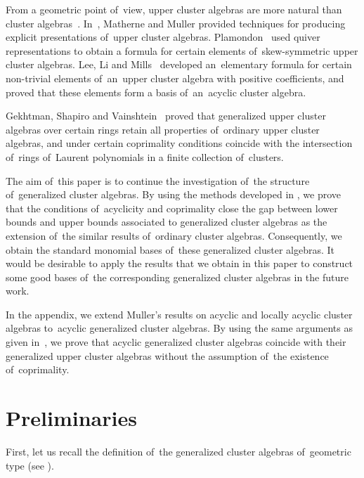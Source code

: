 \documentclass[10pt,a4paper]{amsart}
\numberwithin{equation}{section}
\begin{document}
From a geometric point of~view, upper cluster algebras are more natural than cluster algebras~\cite{BMRS, GHK1}. In~\cite{MM15}, Matherne and Muller provided techniques for producing explicit presentations of~upper cluster algebras. Plamondon~\cite{P} used quiver representations to obtain a formula for certain elements of~skew-symmetric upper cluster algebras. Lee, Li and Mills~\cite{LLM} developed an~elementary formula for certain non-trivial elements of~an~upper cluster algebra with positive coefficients, and proved that these elements form a basis of~an~acyclic cluster algebra.

Gekhtman, Shapiro and Vainshtein~\cite{gsv18} proved that generalized upper cluster algebras over certain rings retain all properties of~ordinary upper cluster algebras, and under certain copri\-mality conditions coincide with the intersection of~rings of~Laurent polynomials in a finite collection of~clusters.

The aim of~this paper is to continue the investigation of~the structure of~generalized cluster algebras. By using the methods developed in \cite{bfz}, we prove that the conditions of~acyclicity and coprimality close the gap between lower bounds and upper bounds associated to generalized cluster algebras as the extension of~the similar results of~ordinary cluster algebras. Consequently, we obtain the standard monomial bases of~these generalized cluster algebras. It would be desi\-rable to apply the results that we obtain in this paper to construct some good bases of~the corresponding generalized cluster algebras in the future work.

In the appendix, we extend Muller's results on acyclic and locally acyclic cluster algebras to~acyclic generalized cluster algebras. By using the same arguments as given in~\cite{muller14}, we prove that acyclic generalized cluster algebras coincide with their generalized upper cluster algebras without the assumption of~the existence of~coprimality.


\section{Preliminaries}

First, let us recall the definition of~the generalized cluster algebras of~geometric type (see \cite{CS, gsv18}).
\end{document}
